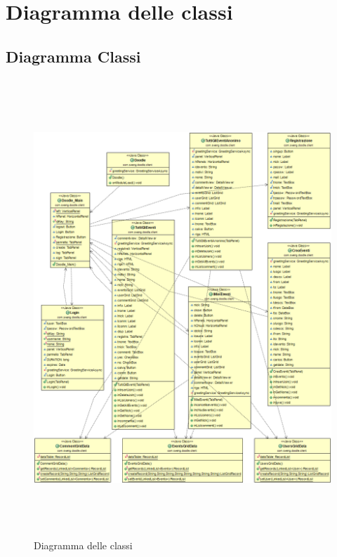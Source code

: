 \chapter{Diagramma delle classi}
\section{Diagramma Classi}
\begin{figure}[!ht]
\centering
\includegraphics[width=14cm, height=17.2cm]{img/diagrammaclassi.png}
\caption{Diagramma delle classi}
\label{fig:diagclassi}
\end{figure}